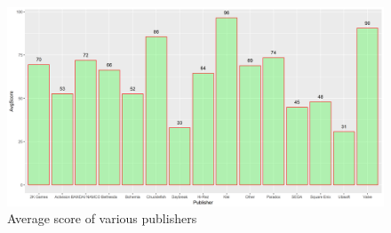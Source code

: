 \documentclass[figures_tabs.tex]{subfiles}
\begin{document}
\begin{figure}[H]
    \centering
    \includegraphics[width=\textwidth]{img/publishers.png}
    \caption{Average score of various publishers}
    \label{fig:publishers}
\end{figure}
\end{document}
